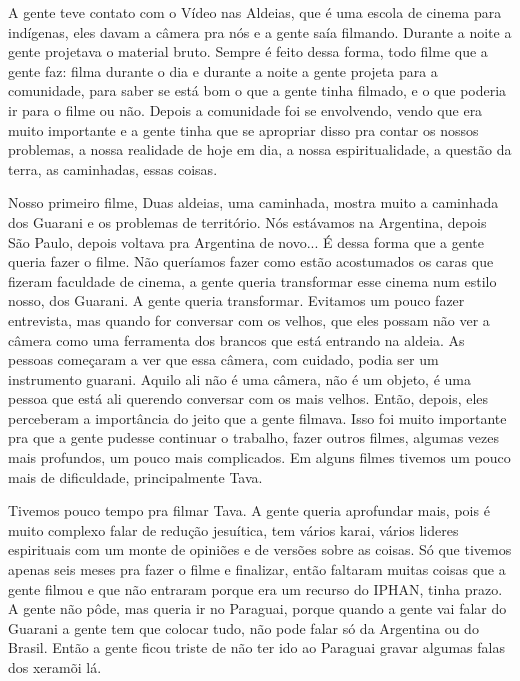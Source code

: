 \documentclass{article}
\begin{document}
A gente teve contato com o V\'ideo nas Aldeias, que \'e uma escola de
cinema para ind\'igenas, eles davam a c\^amera pra n\'os e a gente
sa\'ia filmando. Durante a noite a gente projetava o material bruto.
Sempre \'e feito dessa forma, todo filme que a gente faz: filma durante
o dia e durante a noite a gente projeta para a comunidade, para saber
se est\'a bom o que a gente tinha filmado, e o que poderia ir para o
filme ou n\~ao. Depois a comunidade foi se envolvendo, vendo que era
muito importante e a gente tinha que se apropriar disso pra contar os
nossos problemas, a nossa realidade de hoje em dia, a nossa
espiritualidade, a quest\~ao da terra, as caminhadas, essas coisas. 

Nosso primeiro filme, Duas aldeias, uma caminhada, mostra muito a
caminhada dos Guarani e os problemas de territ\'orio. N\'os est\'avamos
na Argentina, depois S\~ao Paulo, depois voltava pra Argentina de
novo... \'E dessa forma que a gente queria fazer o filme. N\~ao
quer\'iamos fazer como est\~ao acostumados os caras que fizeram
faculdade de cinema, a gente queria transformar esse cinema num estilo
nosso, dos Guarani. A gente queria transformar. Evitamos um pouco fazer
entrevista, mas quando for conversar com os velhos, que eles possam
n\~ao ver a c\^amera como uma ferramenta dos brancos que est\'a
entrando na aldeia. As pessoas come\c{c}aram a ver que essa c\^amera,
com cuidado, podia ser um instrumento guarani. Aquilo ali n\~ao \'e uma
c\^amera, n\~ao \'e um objeto, \'e uma pessoa que est\'a ali querendo
conversar com os mais velhos. Ent\~ao, depois, eles perceberam a
import\^ancia do jeito que a gente filmava. Isso foi muito importante
pra que a gente pudesse continuar o trabalho, fazer outros filmes,
algumas vezes mais profundos, um pouco mais complicados. Em alguns
filmes tivemos um pouco mais de dificuldade, principalmente Tava.  

Tivemos pouco tempo pra filmar Tava. A gente queria aprofundar mais,
pois \'e muito complexo falar de redu\c{c}\~ao jesu\'itica, tem
v\'arios karai, v\'arios lideres espirituais com um monte de opini\~oes
e de vers\~oes sobre as coisas. S\'o que tivemos apenas seis meses pra
fazer o filme e finalizar, ent\~ao faltaram muitas coisas que a gente
filmou e que n\~ao entraram porque era um recurso do IPHAN, tinha
prazo. A gente n\~ao p\^ode, mas queria ir no Paraguai, porque quando a
gente vai falar do Guarani a gente tem que colocar tudo, n\~ao pode
falar s\'o da Argentina ou do Brasil. Ent\~ao a gente ficou triste de
n\~ao ter ido ao Paraguai gravar algumas falas dos xeram\~oi l\'a. 
\end{document}

